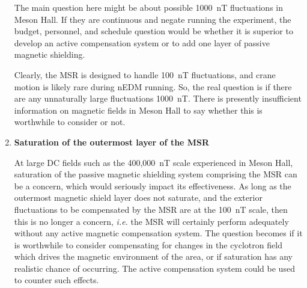 \begin{enumerate}
    The main question here might be about possible 1000~nT fluctuations in Meson Hall. If they are continuous and negate running the experiment, the budget, personnel, and schedule question would be whether it is superior to develop an active compensation system or to add one layer of passive magnetic shielding.

    Clearly, the MSR is designed to handle 100~nT fluctuations, and crane motion is likely rare during nEDM running. So, the real question is if there are any unnaturally large fluctuations 1000~nT. There is presently insufficient information on magnetic fields in Meson Hall to say whether this is worthwhile to consider or not.


    \item {\bf Saturation of the outermost layer of the MSR} 
    
    At large DC fields such as the 400,000~nT scale experienced in Meson Hall, saturation of the passive magnetic shielding system comprising the MSR can be a concern, which would seriously impact its effectiveness. As long as the outermost magnetic shield layer does not saturate, and the exterior fluctuations to be compensated by the MSR are at the 100~nT scale, then this is no longer a concern, {\it i.e.} the MSR will certainly perform adequately without any active magnetic compensation system. The question becomes if it is worthwhile to consider compensating for changes in the cyclotron field which drives the magnetic environment of the area, or if saturation has any realistic chance of occurring.  The active compensation system could be used to counter such effects.
    
    
    
    


\end{enumerate}
